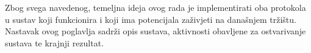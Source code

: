 Zbog svega navedenog, temeljna ideja ovog rada je implementirati oba protokola u sustav koji funkcionira i koji ima potencijala za\v{z}ivjeti na dana\v{s}njem tr\v{z}i\v{s}tu. Nastavak ovog poglavlja sadr\v{z}i opis sustava, aktivnosti obavljene za ostvarivanje sustava te krajnji rezultat.

